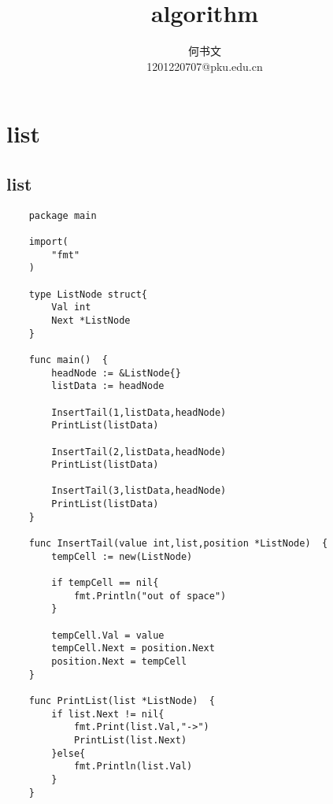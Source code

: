 \documentclass[oneside,12pt,twiside,a4paper]{ctexbook}
\begin{document}
\author
{
何书文\\
1201220707@pku.edu.cn\\
}

\title{algorithm}
\maketitle
\tableofcontents


\chapter{list}
\section{list}

\begin{lstlisting}
    package main

    import(
        "fmt"
    )
    
    type ListNode struct{
        Val int 
        Next *ListNode
    }
    
    func main()  {
        headNode := &ListNode{}
        listData := headNode
    
        InsertTail(1,listData,headNode)
        PrintList(listData)
    
        InsertTail(2,listData,headNode)
        PrintList(listData)
    
        InsertTail(3,listData,headNode)
        PrintList(listData)
    }
    
    func InsertTail(value int,list,position *ListNode)  {
        tempCell := new(ListNode)
    
        if tempCell == nil{
            fmt.Println("out of space")
        }
    
        tempCell.Val = value
        tempCell.Next = position.Next
        position.Next = tempCell
    }
    
    func PrintList(list *ListNode)  {
        if list.Next != nil{
            fmt.Print(list.Val,"->")
            PrintList(list.Next)
        }else{
            fmt.Println(list.Val)
        }
    }
            
\end{lstlisting}
\end{document}
